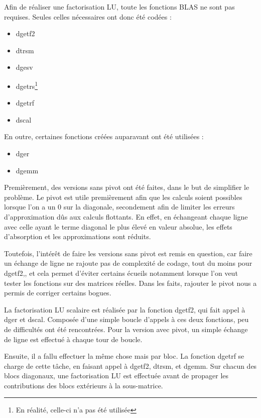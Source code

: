 \documentclass[a4paper,11pt]{article}
\begin{document}
Afin de réaliser une factorisation LU, toute les fonctions BLAS ne sont pas requises. Seules celles nécessaires ont donc été codées :

\begin{itemize}
\item dgetf2
\item dtrsm
\item dgesv
\item dgetrs\footnote{En réalité, celle-ci n'a pas été utilisée}
\item dgetrf
\item dscal
\end{itemize}

En outre, certaines fonctions créées auparavant ont été utilisées : 


\begin{itemize}
\item dger
\item dgemm
\end{itemize}

Premièrement, des versions sans pivot ont été faites, dans le but de simplifier le problème. Le pivot est utile premièrement afin que les calculs soient possibles lorsque l'on a un $0$ sur la diagonale, secondement afin de limiter les erreurs d'approximation dûs aux calculs flottants. En effet, en échangeant chaque ligne avec celle ayant le terme diagonal le plus élevé en valeur absolue, les effets d'absorption et les approximations sont réduits.

Toutefois, l'intérêt de faire les versions sans pivot est remis en question, car faire un échange de ligne ne rajoute pas de complexité de codage, tout du moins pour dgetf2,, et cela permet d'éviter certains écueils notamment lorsque l'on veut tester les fonctions sur des matrices réelles. Dans les faits, rajouter le pivot nous a permis de corriger certains bogues.

La factorisation LU scalaire est réalisée par la fonction dgetf2, qui fait appel à dger et dscal. Composée d'une simple boucle d'appels à ces deux fonctions, peu de difficultés ont été rencontrées. Pour la version avec pivot, un simple échange de ligne est effectué à chaque tour de boucle.

Ensuite, il a fallu effectuer la même chose mais par bloc. La fonction dgetrf se charge de cette tâche, en faisant appel à dgetf2, dtrsm, et dgemm. Sur chacun des blocs diagonaux, une factorisation LU est effectuée avant de propager les contributions des blocs extérieurs à la sous-matrice.
\end{document}
